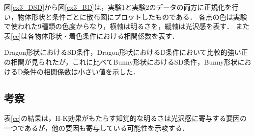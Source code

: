             図\ref{ex3_DSD}から図\ref{ex3_BD}は，実験1と実験2のデータの両方に正規化を行い，物体形状と条件ごとに散布図にプロットしたものである．
            各点の色は実験で使われた9種類の色度からなり，横軸は明るさを，縦軸は光沢感を表す．
            また表\ref{cc}は各物体形状・着色条件における相関係数を表す．

            Dragon形状におけるSD条件，Dragon形状におけるD条件において比較的強い正の相関が見られたが，これに比べてBunny形状におけるSD条件，Bunny形状におけるD条件の相関係数は小さい値を示した．
            
        \subsection{考察}
        
            表\ref{cc}の結果は，H-K効果がもたらす知覚的な明るさは光沢感に寄与する要因の一つであるが，他の要因も寄与している可能性を示唆する．

    \newpage